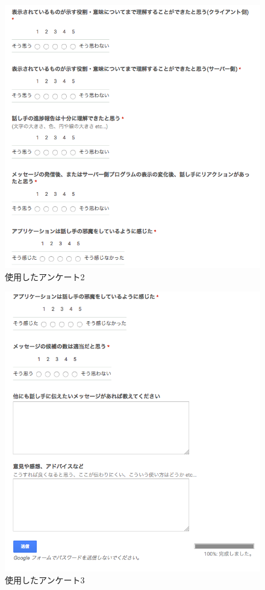 \documentclass{funthesis}
\begin{document}
 \begin{figure}[H]
 \begin{center}
  \includegraphics[width=120mm]{./img/ank2.png}
 \end{center}
 \caption{使用したアンケート2}
 \label{leap}
\end{figure}

 \begin{figure}[H]
 \begin{center}
  \includegraphics[width=120mm]{./img/ank3.png}
 \end{center}
 \caption{使用したアンケート3}
 \label{leap}
\end{figure}
\end{document}
